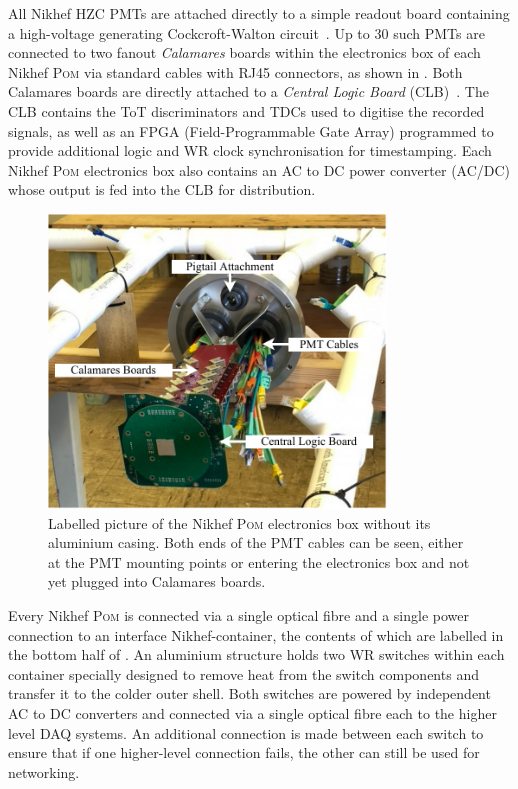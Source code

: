 All Nikhef HZC PMTs are attached directly to a simple readout board containing a high-voltage
generating Cockcroft-Walton circuit~\cite{cockcroft1932}. Up to 30 such PMTs are connected to two
fanout \emph{Calamares} boards within the electronics box of each Nikhef \textsc{Pom} via standard
cables with RJ45 connectors, as shown in . Both Calamares boards are
directly attached to a \emph{Central Logic Board} (CLB)~\cite{biagi2015, eijk2015}. The CLB
contains the ToT discriminators and TDCs used to digitise the recorded signals, as well as an FPGA
(Field-Programmable Gate Array) programmed to provide additional logic and WR clock
synchronisation for timestamping. Each Nikhef \textsc{Pom} electronics box also contains an AC to
DC power converter (AC/DC) whose output is fed into the CLB for distribution.

\begin{figure} %
    \includegraphics[width=0.8\textwidth]{diagrams/5-daq/nikhef_plane.pdf}
    \caption[Labelled picture of the Nikhef \textsc{Pom} electronics box]
    {Labelled picture of the Nikhef \textsc{Pom} electronics box without its aluminium casing.
        Both ends of the PMT cables can be seen, either at the PMT mounting points or entering the
        electronics box and not yet plugged into Calamares boards.}
    \label{fig:nikhef_plane}
\end{figure}

Every Nikhef \textsc{Pom} is connected via a single optical fibre and a single power connection to
an interface Nikhef-container, the contents of which are labelled in the bottom half of
. An aluminium structure holds two WR switches within each container
specially designed to remove heat from the switch components and transfer it to the colder outer
shell. Both switches are powered by independent AC to DC converters and connected via a single
optical fibre each to the higher level DAQ systems. An additional connection is made between each
switch to ensure that if one higher-level connection fails, the other can still be used for
networking.

